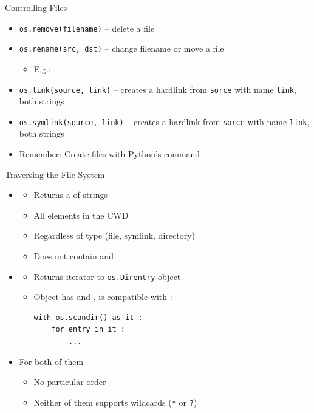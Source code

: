 
\begin{frame}{Controlling Files}
%
\begin{itemize}
\item \texttt{os.remove(filename)} -- delete a file
\item \texttt{os.rename(src, dst)} -- change filename or move a file
	\begin{itemize}
	\item E.\;g.: 
	\end{itemize}
\item \texttt{os.link(source, link)} -- creates a hardlink from \texttt{sorce} with name \texttt{link}, both strings
\item \texttt{os.symlink(source, link)} -- creates a hardlink from \texttt{sorce} with name \texttt{link}, both strings
\item Remember: Create files with Python's  command
\end{itemize}
%
\end{frame}


\begin{frame}[fragile]{Traversing the File System}
%
\begin{itemize}
\item {}
	\begin{itemize}
	\item Returns a  of strings
	\item All elements in the CWD
	\item Regardless of type (file, symlink, directory)
	\item Does not contain  and 
	\end{itemize}
\item {}
	\begin{itemize}
	\item Returns iterator to \texttt{os.Direntry} object
	\item Object has  and , \ie is compatible with :\\
\begin{verbatim}
with os.scandir() as it :
    for entry in it :
        ...
\end{verbatim}
	\end{itemize}
\item For both of them
	\begin{itemize}
	\item No particular order
	\item Neither of them supports wildcards (\texttt{*} or \texttt{?})
	\end{itemize}
\end{itemize}
%
\end{frame}

